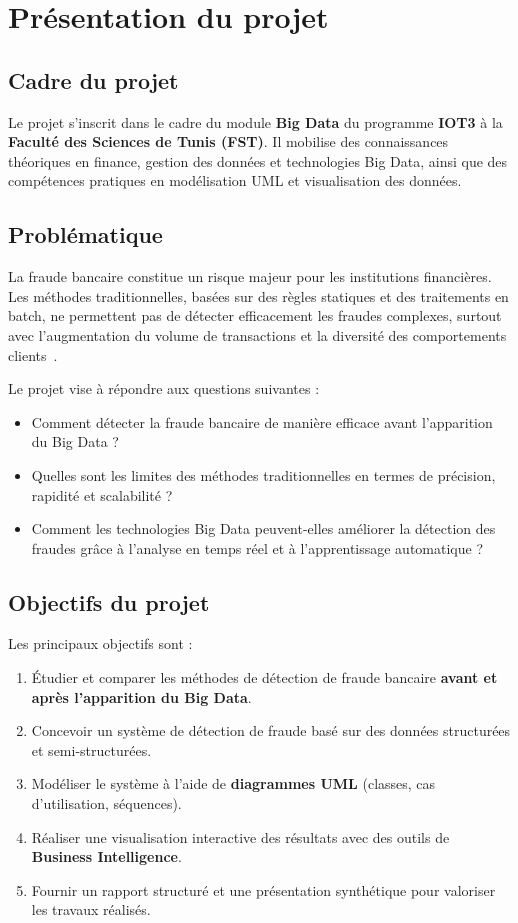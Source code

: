 \chapter{Présentation du projet}
\section{Cadre du projet}
Le projet s’inscrit dans le cadre du module \textbf{Big Data} du programme \textbf{IOT3} à la \textbf{Faculté des Sciences de Tunis (FST)}. 
Il mobilise des connaissances théoriques en finance, gestion des données et technologies Big Data, ainsi que des compétences pratiques en 
modélisation UML et visualisation des données. 

\section{Problématique}
La fraude bancaire constitue un risque majeur pour les institutions financières. 
Les méthodes traditionnelles, basées sur des règles statiques et des traitements en batch, ne permettent pas de détecter efficacement les fraudes complexes, surtout avec l’augmentation du volume de transactions 
et la diversité des comportements clients~\cite{kpmg2025}.

Le projet vise à répondre aux questions suivantes :
\begin{itemize}
    \item Comment détecter la fraude bancaire de manière efficace avant l’apparition du Big Data ?
    \item Quelles sont les limites des méthodes traditionnelles en termes de précision, rapidité et scalabilité ?
    \item Comment les technologies Big Data peuvent-elles améliorer la détection des fraudes grâce à l’analyse en temps réel et à l’apprentissage automatique ?
\end{itemize}

\section{Objectifs du projet}
Les principaux objectifs sont :
\begin{enumerate}
    \item Étudier et comparer les méthodes de détection de fraude bancaire \textbf{avant et après l’apparition du Big Data}.
    \item Concevoir un système de détection de fraude basé sur des données structurées et semi-structurées.
    \item Modéliser le système à l’aide de \textbf{diagrammes UML} (classes, cas d’utilisation, séquences).
    \item Réaliser une visualisation interactive des résultats avec des outils de \textbf{Business Intelligence}.
    \item Fournir un rapport structuré et une présentation synthétique pour valoriser les travaux réalisés.
\end{enumerate}

